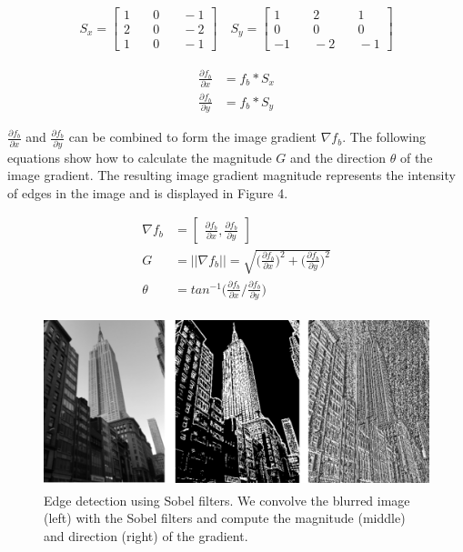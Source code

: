 \documentclass[runningheads]{llncs}
\begin{document}
\begin{align}
S_x = \begin{bmatrix} 
1 & \quad 0 & \quad -1 \\ 
2 & \quad 0 & \quad -2 \\ 
1 & \quad 0 & \quad -1  
\end{bmatrix}
\quad S_y = \begin{bmatrix} 
1 & \quad 2 & \quad 1 \\ 
0 & \quad 0 & \quad 0 \\ 
-1 & \quad -2 & \quad -1  
\end{bmatrix}
\end{align}

\begin{align}
\frac{\partial f_b}{\partial x} &= f_b * S_x \\
\frac{\partial f_b}{\partial y} &= f_b * S_y
\end{align}

$\frac{\partial f_b}{\partial x}$ and $\frac{\partial f_b}{\partial y}$ can be combined to form the image gradient $\nabla f_b$. The following equations show how to calculate the magnitude $G$ and the direction $\theta$ of the image gradient. The resulting image gradient magnitude represents the intensity of edges in the image and is displayed in Figure 4. 

\begin{align}
\nabla f_b &= \begin{bmatrix} \frac{\partial f_b}{\partial x}, \frac{\partial f_b}{\partial y} \end{bmatrix} \\
G &= \vert \vert \nabla f_b \vert \vert = \sqrt{\Big( \frac{\partial f_b}{\partial x} \Big)^2 + \Big( \frac{\partial f_b}{\partial y} \Big)^2} \\
\theta &= tan^{-1} \Big(\frac{\partial f_b}{\partial x} / \frac{\partial f_b}{\partial y})
\end{align}

\begin{figure}
\centering
\includegraphics[height=5cm]{images/edge.png}
\caption{Edge detection using Sobel filters. We convolve the blurred image (left) with the Sobel filters and compute the magnitude (middle) and direction (right) of the gradient.}
\label{fig:example}
\end{figure}
\end{document}
